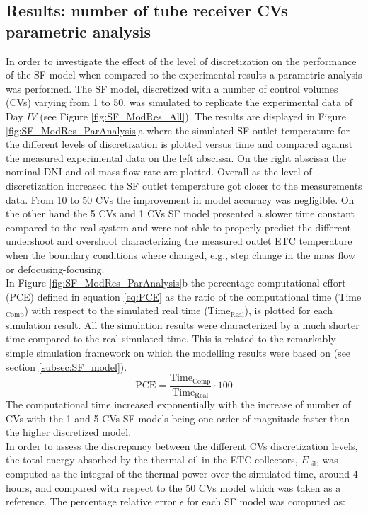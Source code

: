 \documentclass[final,3p,times,review]{elsarticle}
\begin{document}
\subsection{Results: number of tube receiver CVs parametric analysis } 
%
In order to investigate the effect of the level of discretization on the performance of the SF model when compared to the experimental results a parametric analysis was performed. The SF model, discretized with a number of control volumes (CVs) varying from 1 to 50,  was simulated to replicate the  experimental data of Day $IV$ (see Figure \ref{fig:SF_ModRes_All}). The results are displayed in Figure \ref{fig:SF_ModRes_ParAnalysis}a where the simulated SF outlet temperature for the different levels of discretization is plotted versus time and compared against the measured experimental data on the left abscissa. On the right abscissa the nominal DNI and oil mass flow rate are plotted. Overall as the level of discretization increased the SF outlet temperature got closer to the measurements data. From 10 to 50 CVs the improvement in model accuracy was negligible. On the other hand the 5 CVs and 1 CVs SF model presented a slower time constant compared to the real system and were not able to properly predict the different undershoot and overshoot characterizing the measured outlet ETC temperature when the boundary conditions where changed, e.g., step change in the mass flow or defocusing-focusing.\\
In Figure \ref{fig:SF_ModRes_ParAnalysis}b the percentage computational effort (PCE) defined in equation \ref{eq:PCE} as the ratio of the computational time (Time$_\mathrm{Comp}$) with respect to the simulated real time ($\mathrm{Time}_\mathrm{Real}$), is plotted for each simulation result. All the simulation results were characterized by a much shorter time compared to the real simulated time. This is related to the remarkably simple simulation framework on which the modelling results were based on (see section \ref{subsec:SF_model}). 
%
\begin{equation}
\mathrm{PCE} = \frac{\mathrm{Time}_\mathrm{Comp}}{\mathrm{Time}_\mathrm{Real}} \cdot 100
\label{eq:PCE}
\end{equation}
%
The computational time increased exponentially with the increase of number of CVs with the 1 and 5 CVs SF models being one order of magnitude faster than the higher discretized model.\\
In order to assess the discrepancy between the different CVs discretization levels, the total energy absorbed by the thermal oil in the ETC collectors, $E_\mathrm{oil}$,  was computed as the integral of the thermal power over the simulated time, around 4 hours, and compared with respect to the 50 CVs model which was taken as a reference. The percentage relative error $\bar{\epsilon}$ for each SF model was computed as:
\end{document}
